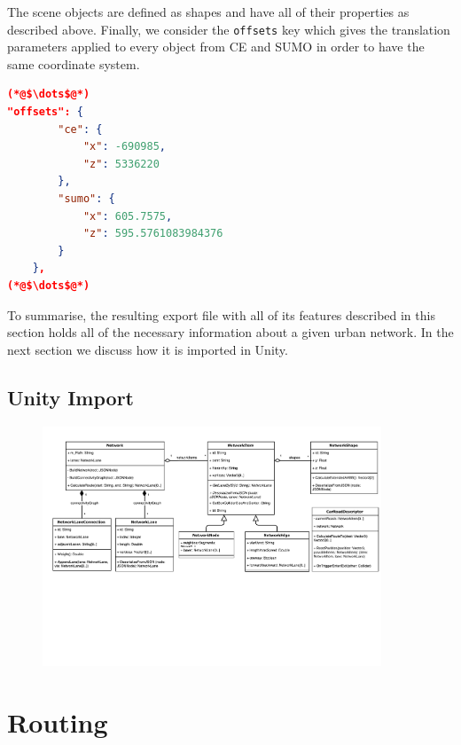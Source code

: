 The scene objects are defined as shapes and have all of their properties as described above. Finally, we consider the \texttt{offsets} key which gives the translation parameters applied to every object from CE and SUMO in order to have the same coordinate system. \\

    \begin{scriptsize}
        \begin{lstlisting}[language=json,firstnumber=1,caption={General overview of the offsets key in the JSON export format.},label={lis:format-node}]
(*@$\dots$@*)
"offsets": {
        "ce": {
            "x": -690985,
            "z": 5336220
        },
        "sumo": {
            "x": 605.7575,
            "z": 595.5761083984376
        }
    },
(*@$\dots$@*)
	   \end{lstlisting}
    \end{scriptsize}
    
To summarise, the resulting export file with all of its features described in this section holds all of the necessary information about a given urban network. In the next section we discuss how it is imported in Unity.

\section{Unity Import}


\begin{figure}[htb]
	\centering
	\includegraphics[width=0.9\textwidth]{figures/unity-uml}
	\label{fig:unity-uml}
	\caption{}
\end{figure}

\chapter{Routing}
\label{ch:gps}

